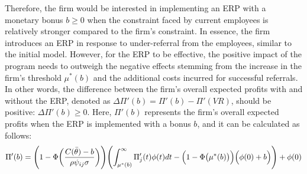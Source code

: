 \documentclass[12pt]{article}
\begin{document}
Therefore, the firm would be interested in implementing an ERP with a monetary bonus $b\geq 0$ when the constraint faced by current employees is relatively stronger compared to the firm's constraint. In essence, the firm introduces an ERP in response to under-referral from the employees, similar to the initial model. However, for the ERP to be effective, the positive impact of the program needs to outweigh the negative effects stemming from the increase in the firm's threshold $\mu^*(b)$ and the additional costs incurred for successful referrals. In other words, the difference between the firm's overall expected profits with and without the ERP, denoted as $\Delta\Pi'(b) = \Pi'(b) - \Pi'(VR)$, should be positive: $\Delta\Pi'(b) \geq 0$. Here, $\Pi'(b)$ represents the firm's overall expected profits when the ERP is implemented with a bonus $b$, and it can be calculated as follows:
\begin{equation}
    \Pi'(b) = 
    \Biggl( 
    1 - \Phi\biggl( \frac{C(\bar{\theta})-b}{\rho \psi_{ij} \sigma} \biggr)
    \Biggr)
    \Biggl( 
    \int^\infty_{\mu^*(b)}\Pi'_j(t)\phi(t)dt 
    -
    \Bigl( 1 - \Phi \bigl(\mu^*(b)\bigr)\Bigr) \Bigl(\phi(0) + b\Bigr)
    \Biggr)
    + \phi(0)
\end{equation}
\end{document}
